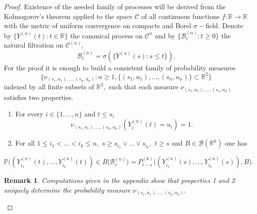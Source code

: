 \documentclass[a4paper,12pt]{article}
\newcommand{\1}{1\!\!\,{\rm I}}
\theoremstyle{plain}
\newtheorem{remark}{Remark}[section]
\begin{document}
\begin{proof} Existence of the needed family of processes will be derived from the Kolmogorov's theorem \cite[Ch. II, Th. (31.1)]{RW} applied to the space $\mathcal{C}$ of all continuous functions $f:\mathbb{R}\to \mathbb{R}$  with the metric of uniform convergence on compacts and Borel $\sigma-$field. Denote by $\{Y^{(n)}(t):t\in\mathbb{R}\}$ the canonical process on $\mathcal{C}^n$
	and by $\{\mathcal{B}^{(n)}_t:t\geq 0\}$ the natural filtration on $\mathcal{C}^{(n)},$
	$$
	\mathcal{B}^{(n)}_t=\sigma(\{Y^{(n)}(s):s\leq t\}).
	$$
	For the proof it is enough to build a consistent family of probability measures
	$$
	\{\nu_{(s_1,u_1),\ldots,(s_n,u_n)}:n\geq 1,\{(s_1,u_1),\ldots,(s_n,u_n)\}\subset \mathbb{R}^2 \}
	$$
	indexed by all finite subsets of $\mathbb{R}^2,$ such that each measure $\nu_{(s_1,u_1),\ldots,(s_n,u_n)}$  satisfies two properties.
	
	\begin{enumerate}
		\item For every $i\in \{1,\ldots,n\}$	and $t\leq s_i$
		$$
		\nu_{(s_1,u_1),\ldots,(s_n,u_n)}(Y^{(n)}_i(t)=u_i)=1.
		$$
		\item For all $1\leq i_1<\ldots<i_k\leq n,$ $s\geq s_{i_1}\vee \ldots\vee s_{i_k},$ $t\geq s$ and $B\in\mathcal{B}(\mathbb{R}^k)$ one has
	\end{enumerate}
	
	$$
	\mathbb{P}  \Big((Y^{(n)}_{i_1}(t),\ldots,Y^{(n)}_{i_k}(t))\in B|\mathcal{B}^{(n)}_s\Big) 
	=P^{(k)}_{t-s}\Big((Y^{(n)}_{i_1}(s),\ldots,Y^{(n)}_{i_k}(s)),B\Big).
	$$
	
	
	\begin{remark}
		\label{rem30_1} Computations given in the appendix  show that properties 1 and 2  uniquely determine the probability measure $\nu_{(s_1,u_1),\ldots,(s_n,u_n)}.$
	\end{remark}
	

\end{proof}
\end{document}
